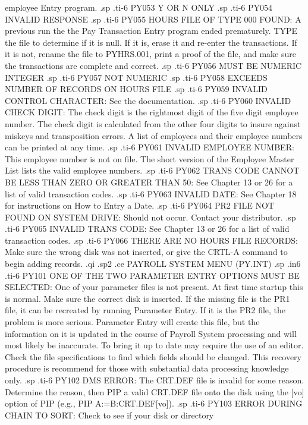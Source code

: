 employee Entry program.
.sp
.ti-6
PY053 Y OR N ONLY
.sp
.ti-6
PY054 INVALID RESPONSE
.sp
.ti-6
PY055 HOURS FILE OF TYPE 000 FOUND:  A previous run the the Pay
Transaction Entry
program ended prematurely.  TYPE the file to determine if it is null.  If
it is, erase it and re-enter the transactions.	If it is not, rename the
file to PYHRS.001, print a proof of the file, and make sure the
transactions are complete and correct.
.sp
.ti-6
PY056 MUST BE NUMERIC INTEGER
.sp
.ti-6
PY057 NOT NUMERIC
.sp
.ti-6
PY058 EXCEEDS NUMBER OF RECORDS ON HOURS FILE
.sp
.ti-6
PY059 INVALID CONTROL CHARACTER: See the documentation.
.sp
.ti-6
PY060 INVALID CHECK DIGIT: The check digit is the rightmost digit of the
five digit employee number.  The check digit is calculated from the other
four digits to insure against miskeys and transposition errors.  A list of
employees and their employee numbers can be printed at any time.
.sp
.ti-6
PY061 INVALID EMPLOYEE NUMBER:	This employee number is not on file.
The short version of the Employee Master List lists the valid
employee numbers.
.sp
.ti-6
PY062 TRANS CODE CANNOT BE LESS THAN ZERO OR GREATER THAN 50:  See Chapter 13
or 26 for a list of valid transaction codes.
.sp
.ti-6
PY063 INVALID DATE: See Chapter 18 for instructions on How to Entry a Date.
.sp
.ti-6
PY064 PR2 FILE NOT FOUND ON SYSTEM DRIVE: Should not occur. Contact your
distributor.
.sp
.ti-6
PY065 INVALID TRANS CODE: See Chapter 13 or 26 for a list of valid transaction
codes.
.sp
.ti-6
PY066 THERE ARE NO HOURS FILE RECORDS:	Make sure the wrong disk was not
inserted, or give the CRTL-A command to begin adding records.
.qi
.sp2
.ce
PAYROLL SYSTEM MENU  (PY.INT)
.sp
.in6
.ti-6
PY101 ONE OF THE TWO PARAMETER ENTRY OPTIONS MUST BE SELECTED:	One of your
parameter files is not present.  At first time startup this is normal.
Make sure the correct disk is inserted.  If the missing file is the PR1
file, it can be recreated by running Parameter Entry.  If it is the
PR2 file, the problem is more serious.	Parameter Entry will create this
file, but the information on it is updated in the course of Payroll System
processing and will most likely be inaccurate.	To bring it up to date may
require the use of an editor.  Check the file specifications to find which
fields should be changed.  This recovery procedure is recommend for those
with substantial data processing knowledge only.
.sp
.ti-6
PY102 DMS ERROR: The CRT.DEF file is invalid for some reason.  Determine
the reason, then PIP a valid CRT.DEF file onto the disk using the [vo]
option of PIP (e.g., PIP A:=B:CRT.DEF[vo]).
.sp
.ti-6
PY103 ERROR DURING CHAIN TO SORT: Check to see if your disk or directory
